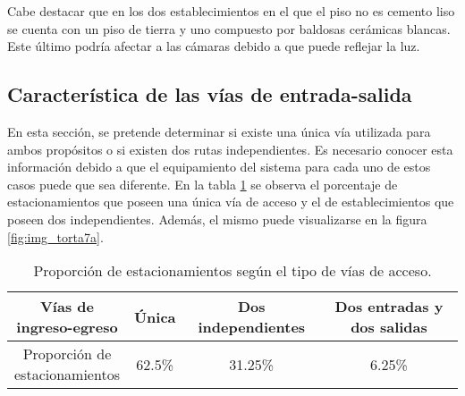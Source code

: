 
Cabe destacar que en los dos establecimientos en el que el piso no es cemento liso se cuenta con un piso de tierra y uno compuesto por baldosas cerámicas blancas. Este último podría afectar a las cámaras debido a que puede reflejar la luz.

\subsection{Característica de las vías de entrada-salida}
En esta sección, se pretende determinar si existe una única vía utilizada para ambos propósitos o si existen dos rutas independientes. Es necesario conocer esta información debido a que el equipamiento del sistema para cada uno de estos casos puede que sea diferente. En la tabla \ref{tabla:est_vias} se observa el porcentaje de estacionamientos que poseen una única vía de acceso y el de establecimientos que poseen dos independientes. Además, el mismo puede visualizarse en la figura \ref{fig:img_torta7a}.
\begin{table}[htbp]
	\begin{center}
		\begin{tabular}{|c|c|c|c|}
			\hline
			\parbox{3cm}{\centering Vías de \\ ingreso-egreso} & Única & Dos independientes & Dos entradas y dos salidas\\
			\hline \hline
			\parbox{3cm}{\centering Proporción de \\ estacionamientos \\ \quad} & 62.5\% & 31.25\% & 6.25\%\\ \hline
		\end{tabular}
		\caption{Proporción de estacionamientos según el tipo de vías de acceso.}
		\label{tabla:est_vias}
	\end{center}
\end{table}

